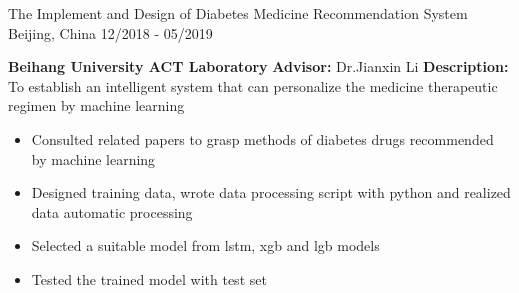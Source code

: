 

\begin{cventries}
  
  \cventry
    {}
    {The Implement and Design of Diabetes Medicine Recommendation System}
    {Beijing, China}
    {12/2018 - 05/2019}
    {
      \textbf{Beihang University ACT Laboratory} \quad \textbf{Advisor:} Dr.Jianxin Li
      \newline
      \textbf{Description:} To establish an intelligent system that can personalize the medicine therapeutic regimen by machine learning
      \begin{itemize}
        \item {Consulted related papers to grasp methods of diabetes drugs recommended by machine learning}
        \item {Designed training data, wrote data processing script with python and realized data automatic processing}
        \item {Selected a suitable model from lstm, xgb and lgb models}
        \item {Tested the trained model with test set}
      \end{itemize}
    }


\end{cventries}
